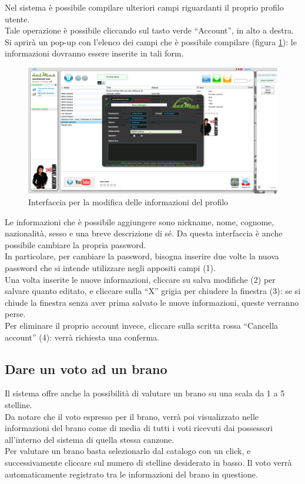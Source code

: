 Nel sistema  \`e possibile compilare ulteriori campi riguardanti il
proprio profilo utente.\\
Tale operazione \`e possibile cliccando sul tasto verde ``Account'', in alto a
destra.
Si aprir\`a un pop-up con l'elenco dei campi che \`e possibile
compilare (figura \ref{fig:profilo}): le informazioni dovranno essere inserite
in tali form.\\
\begin{figure}[!htbp]
  \centering
  \includegraphics[width=14cm]{img/MU/profile_view.png}
\caption{Interfaccia per la modifica delle informazioni del profilo}
\label{fig:profilo}
\end{figure}

Le informazioni che \`e possibile aggiungere sono nickname, nome, cognome,
nazionalit\`a, sesso e una breve descrizione di s\'e. Da questa interfaccia \`e
anche possibile cambiare la propria password.\\

In particolare, per cambiare la password, bisogna inserire due volte la nuova
password che si intende utilizzare negli appositi campi (1).\\

Una volta inserite le nuove informazioni, cliccare su salva modifiche (2) per
salvare quanto editato, e cliccare sulla ``X'' grigia per chiudere la finestra
(3): se si chiude la finestra senza aver prima salvato le nuove informazioni,
queste verranno perse.\\

Per eliminare il proprio account invece, cliccare sulla scritta rossa ``Cancella
account'' (4): verr\`a richiesta una conferma.

\subsection{Dare un voto ad un brano}
\label{cap:voto}
Il sistema  offre anche la possibilit\`a di valutare un brano su una
scala da 1 a 5 stelline.\\
Da notare che il voto espresso per il brano, verr\`a poi visualizzato nelle
informazioni del brano come di media di tutti i voti ricevuti dai
possessori all'interno del sistema  di quella stessa canzone.\\
Per valutare un brano basta selezionarlo dal catalogo con un click, e
successivamente cliccare sul numero di stelline desiderato in basso. Il voto
verr\`a automaticamente registrato tra le informazioni del brano in questione.

